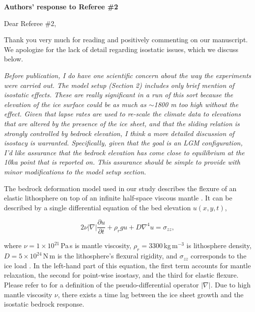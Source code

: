 \documentclass[10pt]{article}
\begin{document}
\textbf{Authors' response to Referee {\#}2}
\bigskip


\def\doi#1{doi:\allowbreak\href{http://dx.doi.org/#1}{#1}}
\def\referee#1{\bigskip\textcolor{journalname}{\textit{#1}}}
\def\msquote#1{\begin{quote}\textit{#1}\end{quote}}

Dear Referee {\#}2,

Thank you very much for reading and positively commenting on our manuscript. We apologize for the lack of detail regarding isostatic issues, which we discuss below.

\referee{Before publication, I do have one scientific concern about the way the experiments were carried out. The model setup (Section 2) includes only brief mention of isostatic effects. These are really significant in a run of this sort because the elevation of the ice surface could be as much as $\sim$1800 m too high without the effect. Given that lapse rates are used to re-scale the climate data to elevations that are altered by the presence of the ice sheet, and that the sliding relation is strongly controlled by bedrock elevation, I think a more detailed discussion of isostacy is warranted. Specifically, given that the goal is an LGM configuration, I'd like assurance that the bedrock elevation has come close to equilibrium at the 10ka point that is reported on. This assurance should be simple to provide with minor modifications to the model setup section.}

The bedrock deformation model used in our study describes the flexure of an elastic lithosphere on top of an infinite half-space viscous mantle \citep{lingle-clark-1985}. It can be described by a single differential equation of the bed elevation $u(x, y, t)$,

\begin{equation}
    2 \nu |\nabla| \frac{\partial u}{\partial t}
    + \rho_r g u
    + D \nabla^4 u
    = \sigma_{zz},
\end{equation}

where $\nu=1\times10^{21}$\,Pa\,s is mantle viscosity, $\rho_r = 3300$\,kg\,m$^{-3}$ is lithosphere density, $D=5\times10^{24}$\,N\,m is the lithosphere's flexural rigidity, and $\sigma_{zz}$ corresponds to the ice load \citet{bueler-etal-2007}. In the left-hand part of this equation, the first term accounts for mantle relaxation, the second for point-wise isostasy, and the third for elastic flexure. Please refer to \citet{bueler-etal-2007} for a definition of the pseudo-differential operator $|\nabla|$. Due to high mantle viscosity $\nu$, there exists a time lag between the ice sheet growth and the isostatic bedrock response.
\end{document}
